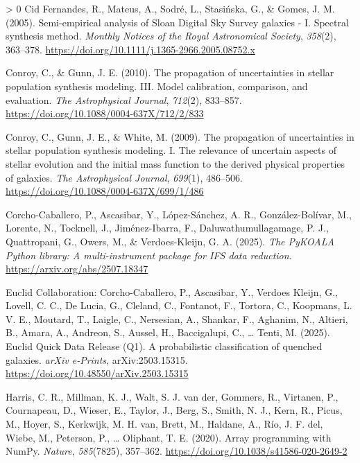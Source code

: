 \documentclass[10pt,a4paper,onecolumn]{article}
\newlength{\cslhangindent}
\newenvironment{CSLReferences}[3] %
 {%
  \setlength{\parindent}{0pt}
  \ifodd #1 \everypar{\setlength{\hangindent}{\cslhangindent}}\ignorespaces\fi
  \ifnum #2 > 0
  \setlength{\parskip}{#2\baselineskip}
  \fi
 }%
 {}
\begin{document}
\begin{CSLReferences}{1}{0}
\leavevmode\hypertarget{ref-cid-fernandes+05}{}%
Cid Fernandes, R., Mateus, A., Sodr\'e, L., Stasi\'nska, G., \& Gomes, J. M.
(2005). {Semi-empirical analysis of Sloan Digital Sky Survey galaxies -
I. Spectral synthesis method}. \emph{Monthly Notices of the Royal
Astronomical Society}, \emph{358}(2), 363--378.
\url{https://doi.org/10.1111/j.1365-2966.2005.08752.x}

\leavevmode\hypertarget{ref-conroyux5cux26gunn10}{}%
Conroy, C., \& Gunn, J. E. (2010). The propagation of uncertainties in
stellar population synthesis modeling. {III}. Model calibration,
comparison, and evaluation. \emph{The Astrophysical Journal},
\emph{712}(2), 833--857.
\url{https://doi.org/10.1088/0004-637X/712/2/833}

\leavevmode\hypertarget{ref-conroy+09}{}%
Conroy, C., Gunn, J. E., \& White, M. (2009). The propagation of
uncertainties in stellar population synthesis modeling. {I}. The
relevance of uncertain aspects of stellar evolution and the initial mass
function to the derived physical properties of galaxies. \emph{The
Astrophysical Journal}, \emph{699}(1), 486--506.
\url{https://doi.org/10.1088/0004-637X/699/1/486}

\leavevmode\hypertarget{ref-pykoala_adass}{}%
Corcho-Caballero, P., Ascasibar, Y., L\'opez-S\'anchez, A. R.,
Gonz\'alez-Bol\'ivar, M., Lorente, N., Tocknell, J., Jim\'enez-Ibarra, F.,
Daluwathumullagamage, P. J., Quattropani, G., Owers, M., \&
Verdoes-Kleijn, G. A. (2025). \emph{The {PyKOALA} {Python} library: A
multi-instrument package for {IFS} data reduction}.
\url{https://arxiv.org/abs/2507.18347}

\leavevmode\hypertarget{ref-cc+25}{}%
Euclid Collaboration: Corcho-Caballero, P., Ascasibar, Y., Verdoes
Kleijn, G., Lovell, C. C., De Lucia, G., Cleland, C., Fontanot, F.,
Tortora, C., Koopmans, L. V. E., Moutard, T., Laigle, C., Nersesian, A.,
Shankar, F., Aghanim, N., Altieri, B., Amara, A., Andreon, S., Aussel,
H., Baccigalupi, C., \ldots{} Tenti, M. (2025). {Euclid Quick Data
Release (Q1). A probabilistic classification of quenched galaxies}.
\emph{arXiv e-Prints}, arXiv:2503.15315.
\url{https://doi.org/10.48550/arXiv.2503.15315}

\leavevmode\hypertarget{ref-harris2020array}{}%
Harris, C. R., Millman, K. J., Walt, S. J. van der, Gommers, R.,
Virtanen, P., Cournapeau, D., Wieser, E., Taylor, J., Berg, S., Smith,
N. J., Kern, R., Picus, M., Hoyer, S., Kerkwijk, M. H. van, Brett, M.,
Haldane, A., R\'io, J. F. del, Wiebe, M., Peterson, P., \ldots{} Oliphant,
T. E. (2020). Array programming with {NumPy}. \emph{Nature},
\emph{585}(7825), 357--362.
\url{https://doi.org/10.1038/s41586-020-2649-2}


\end{CSLReferences}
\end{document}

